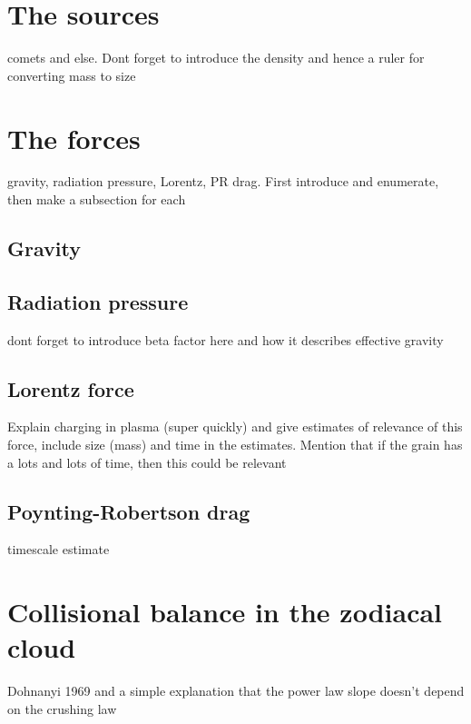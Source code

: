 \section{The sources}

comets and else. Dont forget to introduce the density and hence a ruler for converting mass to size

\section{The forces}

gravity, radiation pressure, Lorentz, PR drag. First introduce and enumerate, then make a subsection for each

\subsection{Gravity}

\subsection{Radiation pressure}

dont forget to introduce beta factor here and how it describes effective gravity

\subsection{Lorentz force}

Explain charging in plasma (super quickly) and give estimates of relevance of this force, include size (mass) and time in the estimates. Mention that if the grain has a lots and lots of time, then this could be relevant

\subsection{Poynting-Robertson drag}

timescale estimate 


\section{Collisional balance in the zodiacal cloud}

Dohnanyi 1969 and a simple explanation that the power law slope doesn't depend on the crushing law
